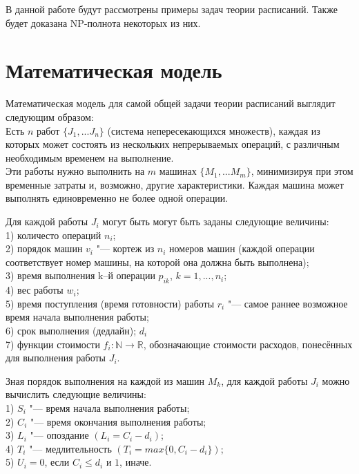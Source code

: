 \documentclass[a4paper,12pt]{article}
\theoremstyle{plain} %
\theoremstyle{definition} %
\theoremstyle{remark} %
\begin{document}
В данной работе будут рассмотрены примеры задач теории расписаний. Также будет доказана NP-полнота некоторых из них.

\newpage

\section{Математическая модель}

Математическая модель для самой общей задачи теории расписаний выглядит следующим образом: \\
Есть $n$ работ $\{J_1, ... J_n\}$ (система непересекающихся множеств), каждая из которых может состоять из нескольких непрерываемых операций, с различным необходимым временем на выполнение.\\
Эти работы нужно выполнить на $m$ машинах $\{M_1, ... M_m\}$, минимизируя при этом временные затраты и, возможно, другие характеристики. Каждая машина может выполнять единовременно не более одной операции.

\par\bigskip
Для каждой работы $J_i$ могут быть могут быть заданы следующие величины:\\
1) количесто операций $n_i$;\\
2) порядок машин $v_i$ "--- кортеж из $n_i$ номеров машин (каждой операции соответствует номер машины, на которой она должна быть выполнена);\\
3) время выполнения k--й операции $p_{ik}$, $k=1,...,n_i$;\\
4) вес работы $w_i$;\\
5) время поступления (время готовности) работы $r_i$ "--- самое раннее возможное время начала выполнения работы;\\
6) срок выполнения (дедлайн); $d_i$\\
7) функции стоимости $f_i: \mathbb{N} \to \mathbb{R}$, обозначающие стоимости расходов, понесённых для выполнения работы $J_i$.

\par\bigskip
Зная порядок выполнения на каждой из машин $M_k$, для каждой работы $J_i$ можно вычислить следующие величины:\\
1) $S_i$ "--- время начала выполнения работы; \\
2) $C_i$ "--- время окончания выполнения работы; \\
3) $L_i$ "--- опоздание $(L_i = C_i - d_i)$;\\
4) $T_i$ "--- медлительность $(T_i = max\{0, C_i - d_i\})$;\\
5) $U_i = 0$, если $C_i \le d_i$ и $1$, иначе.
\end{document}
